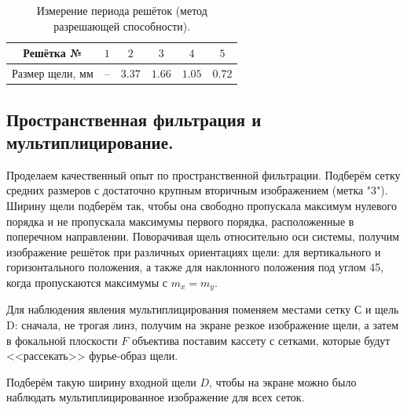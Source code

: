 \documentclass[a4paper, 12pt, twoside]{article}
\begin{document}
	\begin{table}[H]
		\centering
		\caption{Измерение периода решёток (метод разрешающей способности).}
		\label{t3}
		\begin{tabular}{c|c|c|c|c|c} \toprule
			Решётка №       & $1$    & $2$    & $3$    & $4$    & $5$ \\ \midrule
			Размер щели, мм & -- & $3.37$ & $1.66$ & $1.05$ & $0.72$  \\ \bottomrule
		\end{tabular}
	\end{table}
	
	\subsection{Пространственная фильтрация и мультиплицирование.}
	
	Проделаем качественный опыт по пространственной фильтрации. Подберём сетку средних размеров с достаточно крупным вторичным изображением (метка "3"). Ширину щели подберём так, чтобы она свободно пропускала максимум нулевого порядка и не пропускала максимумы первого порядка, расположенные в поперечном направлении. Поворачивая щель относительно оси системы, получим изображение решёток при различных ориентациях щели: для вертикального и горизонтального положения, а также для наклонного положения под углом 45\degree, когда пропускаются максимумы с $m_x = m_y$.
	
	
	Для наблюдения явления мультиплицирования поменяем местами сетку С и щель D: сначала, не трогая линз, получим на экране резкое изображение щели, а затем в фокальной плоскости $F$ объектива поставим кассету с сетками, которые будут <<рассекать>> фурье-образ щели.
	
	Подберём такую ширину входной щели $D$, чтобы на экране можно было наблюдать мультиплицированное изображение для всех сеток.
	
\end{document}
